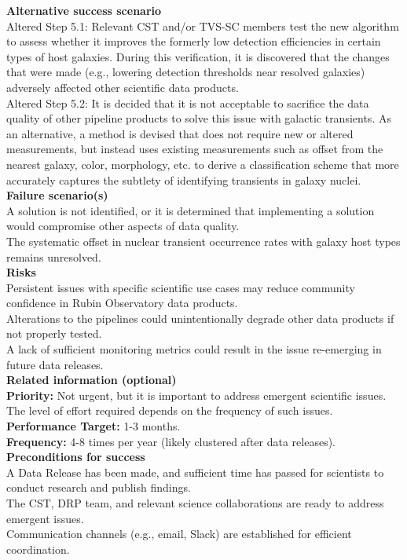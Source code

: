 \textbf{Alternative success scenario} \\
Altered Step 5.1: Relevant CST and/or TVS-SC members test the new algorithm to assess whether it improves the formerly low detection efficiencies in certain types of host galaxies. 
During this verification, it is discovered that the changes that were made (e.g., lowering detection thresholds near resolved galaxies) adversely affected other scientific data products. \\
Altered Step 5.2: It is decided that it is not acceptable to sacrifice the data quality of other pipeline products to solve this issue with galactic transients. 
As an alternative, a method is devised that does not require new or altered measurements, but instead uses existing measurements such as offset from the nearest galaxy, color, morphology, etc. to derive a classification scheme that more accurately captures the subtlety of identifying transients in galaxy nuclei. \\

\textbf{Failure scenario(s)} \\
A solution is not identified, or it is determined that implementing a solution would compromise other aspects of data quality. \\
The systematic offset in nuclear transient occurrence rates with galaxy host types remains unresolved. \\

\textbf{Risks} \\
Persistent issues with specific scientific use cases may reduce community confidence in Rubin Observatory data products. \\
Alterations to the pipelines could unintentionally degrade other data products if not properly tested. \\
A lack of sufficient monitoring metrics could result in the issue re-emerging in future data releases.\\

\textbf{Related information (optional)} \\
\textbf{Priority:} Not urgent, but it is important to address emergent scientific issues.
The level of effort required depends on the frequency of such issues. \\
\textbf{Performance Target:} 1-3 months. \\
\textbf{Frequency:} 4-8 times per year (likely clustered after data releases). \\

\textbf{Preconditions for success} \\
A Data Release has been made, and sufficient time has passed for scientists to conduct research and publish findings. \\
The CST, DRP team, and relevant science collaborations are ready to address emergent issues. \\
Communication channels (e.g., email, Slack) are established for efficient coordination.
